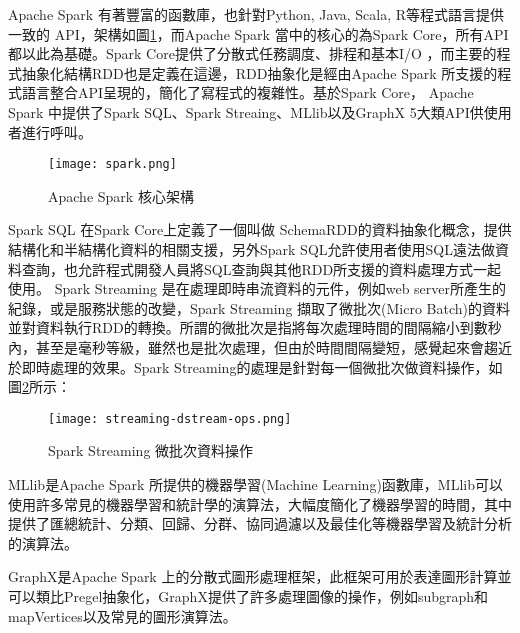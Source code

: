 Apache Spark 有著豐富的函數庫，也針對Python, Java, Scala, R等程式語言提供一致的 API，架構如圖\ref{sparkcore}，而Apache Spark 當中的核心的為Spark Core，所有API都以此為基礎。Spark Core提供了分散式任務調度、排程和基本I/O ，而主要的程式抽象化結構RDD也是定義在這邊，RDD抽象化是經由Apache Spark 所支援的程式語言整合API呈現的，簡化了寫程式的複雜性。基於Spark Core， Apache Spark 中提供了Spark SQL、Spark Streaing、MLlib以及GraphX 5大類API供使用者進行呼叫。\\\par

\begin{figure}[H]
\graphicspath{{/Users/FUDA/Documents/masterThesis/image/}}
\texttt{[image: spark.png]}
\caption{Apache Spark 核心架構}
\label{sparkcore}
\end{figure}

Spark SQL 在Spark Core上定義了一個叫做 SchemaRDD的資料抽象化概念，提供結構化和半結構化資料的相關支援，另外Spark SQL允許使用者使用SQL遠法做資料查詢，也允許程式開發人員將SQL查詢與其他RDD所支援的資料處理方式一起使用。
Spark Streaming 是在處理即時串流資料的元件，例如web server所產生的紀錄，或是服務狀態的改變，Spark Streaming 擷取了微批次(Micro Batch)的資料並對資料執行RDD的轉換。所謂的微批次是指將每次處理時間的間隔縮小到數秒內，甚至是毫秒等級，雖然也是批次處理，但由於時間間隔變短，感覺起來會趨近於即時處理的效果。Spark Streaming的處理是針對每一個微批次做資料操作，如圖\ref{microbatch}所示：
\begin{figure}[H]
\centering
\graphicspath{{/Users/FUDA/Documents/masterThesis/image/}}
\texttt{[image: streaming-dstream-ops.png]}
\caption{Spark Streaming 微批次資料操作 }
\label{microbatch}
\end{figure}
MLlib是Apache Spark 所提供的機器學習(Machine Learning)函數庫，MLlib可以使用許多常見的機器學習和統計學的演算法，大幅度簡化了機器學習的時間，其中提供了匯總統計、分類、回歸、分群、協同過濾以及最佳化等機器學習及統計分析的演算法。

GraphX是Apache Spark 上的分散式圖形處理框架，此框架可用於表達圖形計算並可以類比Pregel抽象化，GraphX提供了許多處理圖像的操作，例如subgraph和mapVertices以及常見的圖形演算法。
